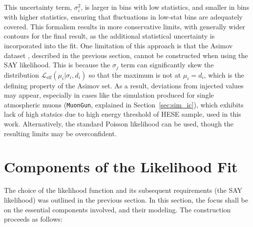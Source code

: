 This uncertainty term, $\sigma_i^2$, is larger in bins with low statistics, and smaller in bins with higher statistics, ensuring that fluctuations in low-stat bins are adequately covered. This formalism results in more conservative limits, with generally wider contours for the final result, as the additional statistical uncertainty is incorporated into the fit. One limitation of this approach is that the Asimov dataset , described in the previous section, cannot be constructed when using the SAY likelihood. This is because the $\sigma_j$ term can significantly skew the distribution $\mathcal{L}_{\text{eff}}(\mu_i | \sigma_i, d_i)$ so that the maximum is not at $\mu_i=d_i$, which is the defining property of the Asimov set. As a result, deviations from injected values may appear, especially in cases like the simulation produced for single atmospheric muons (\texttt{MuonGun}, explained in Section~\ref{sec:sim_ic}), which exhibits lack of high statsics due to high energy threshold of HESE sample, used in this work. Alternatively, the standard Poisson likelihood can be used, though the resulting limits may be overconfident.


\section{Components of the Likelihood Fit}
\label{sec:components}
The choice of the likelihood function and its subsequent requirements (the SAY likelihood)  was outlined in the previous section. In this section, the focus shall be on the essential components involved, and their modeling. The construction proceeds as follows:

